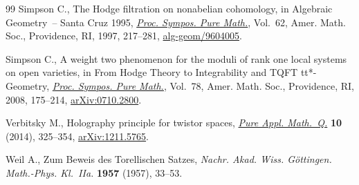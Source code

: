 \documentclass[pdftex]{sigma}
\numberwithin{equation}{section}
\begin{document}
\begin{thebibliography}{99}
Simpson C., The {H}odge f\/iltration on nonabelian cohomology, in Algebraic
 Geometry~-- {S}anta {C}ruz 1995, \href{https://doi.org/10.1090/pspum/062.2/1492538}{\textit{Proc. Sympos. Pure Math.}}, Vol.~62,
 Amer. Math. Soc., Providence, RI, 1997, 217--281, \href{https://arxiv.org/abs/alg-geom/9604005}{alg-geom/9604005}.

Simpson C., A weight two phenomenon for the moduli of rank one local systems on
 open varieties, in From {H}odge Theory to Integrability and {TQFT}
 tt*-Geometry, \href{https://doi.org/10.1090/pspum/078/2483751}{\textit{Proc. Sympos. Pure Math.}}, Vol.~78, Amer. Math. Soc.,
 Providence, RI, 2008, 175--214, \href{https://arxiv.org/abs/0710.2800}{arXiv:0710.2800}.

Verbitsky M., Holography principle for twistor spaces, \href{https://doi.org/10.4310/PAMQ.2014.v10.n2.a6}{\textit{Pure Appl.
 Math.~Q.}} \textbf{10} (2014), 325--354, \href{https://arxiv.org/abs/1211.5765}{arXiv:1211.5765}.

Weil A., Zum {B}eweis des {T}orellischen {S}atzes, \textit{Nachr. Akad. Wiss.
 G\"ottingen. Math.-Phys. Kl.~IIa.} \textbf{1957} (1957), 33--53.

\end{thebibliography}\LastPageEnding
\end{document}
